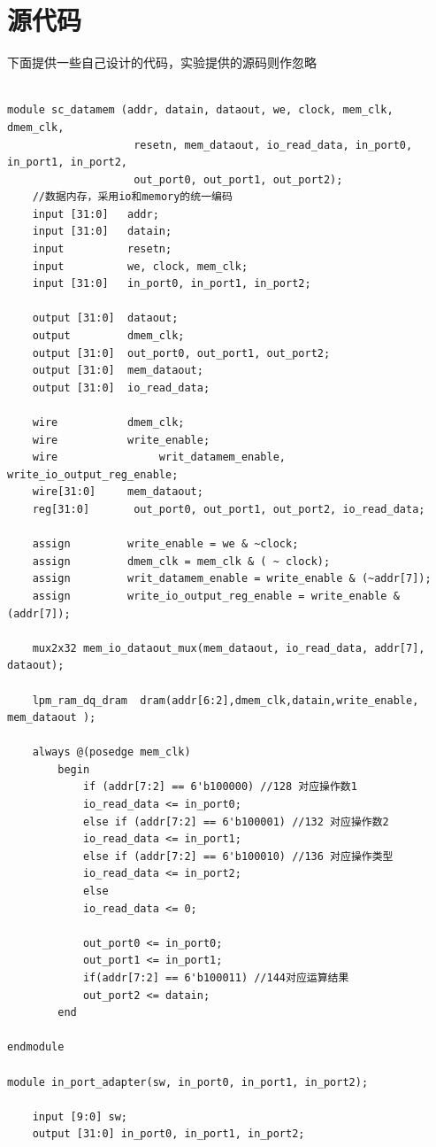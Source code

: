 \documentclass[UTF8]{ctexart}
\begin{document}
\section{源代码}
下面提供一些自己设计的代码，实验提供的源码则作忽略
\begin{verbatim}

module sc_datamem (addr, datain, dataout, we, clock, mem_clk, dmem_clk,
                    resetn, mem_dataout, io_read_data, in_port0, in_port1, in_port2,
                    out_port0, out_port1, out_port2);
    //数据内存，采用io和memory的统一编码
    input [31:0]   addr;
    input [31:0]   datain;
    input          resetn;
    input          we, clock, mem_clk;
    input [31:0]   in_port0, in_port1, in_port2;

    output [31:0]  dataout;
    output         dmem_clk;
    output [31:0]  out_port0, out_port1, out_port2;
    output [31:0]  mem_dataout;
    output [31:0]  io_read_data;

    wire           dmem_clk;
    wire           write_enable;
    wire 				writ_datamem_enable, write_io_output_reg_enable;
    wire[31:0]     mem_dataout;
    reg[31:0] 		out_port0, out_port1, out_port2, io_read_data;

    assign         write_enable = we & ~clock;
    assign         dmem_clk = mem_clk & ( ~ clock);
    assign         writ_datamem_enable = write_enable & (~addr[7]);
    assign         write_io_output_reg_enable = write_enable & (addr[7]);

    mux2x32 mem_io_dataout_mux(mem_dataout, io_read_data, addr[7], dataout);

    lpm_ram_dq_dram  dram(addr[6:2],dmem_clk,datain,write_enable, mem_dataout );

    always @(posedge mem_clk)
        begin
            if (addr[7:2] == 6'b100000) //128 对应操作数1
            io_read_data <= in_port0;
            else if (addr[7:2] == 6'b100001) //132 对应操作数2
            io_read_data <= in_port1;
            else if (addr[7:2] == 6'b100010) //136 对应操作类型
            io_read_data <= in_port2;
            else
            io_read_data <= 0;

            out_port0 <= in_port0;
            out_port1 <= in_port1;
            if(addr[7:2] == 6'b100011) //144对应运算结果
            out_port2 <= datain;
        end

endmodule

module in_port_adapter(sw, in_port0, in_port1, in_port2);

    input [9:0] sw;
    output [31:0] in_port0, in_port1, in_port2;


\end{verbatim}
\end{document}
